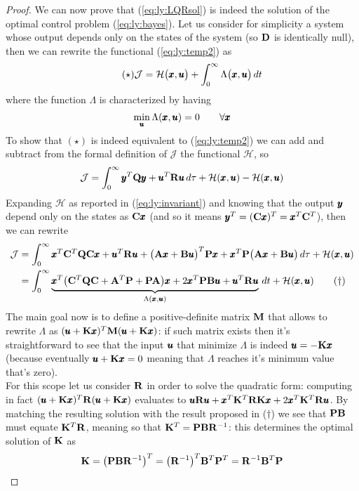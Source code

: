 	\begin{proof}
		We can now prove that (\ref{eq:ly:LQRsol}) is indeed the solution of the optimal control problem (\ref{eq:ly:bayes}). Let us consider for simplicity a system whose output depends only on the states of the system (so $\mathbf{D}$ is identically null), then we can rewrite the functional (\ref{eq:ly:temp2}) as
		\[ \tag{$\star$} \mathcal J = \mathcal H\big(\pmb{x}, \pmb{u} \big) + \int_0^\infty \Lambda\big(\pmb{x}, \pmb{u} \big)\, dt \]
		where the function $\Lambda$ is characterized by having
		\[ \min_{\pmb{u}} \Lambda(\pmb{x},\pmb{u}) = 0 \qquad \forall \pmb{x} \]
		To show that $(\star)$ is indeed equivalent to (\ref{eq:ly:temp2}) we can add and subtract from the formal definition of $\mathcal J$ the functional $\mathcal H$, so
		\[ \mathcal J = \int_0^\infty \pmb{y}^T \mathbf{Q} \pmb{y} + \pmb{u}^T \mathbf{R} \pmb{u} \, d\tau + \mathcal H(\pmb{x},\pmb{u}) - \mathcal H(\pmb{x}, \pmb{u})  \]
		Expanding $\mathcal H$ as reported in (\ref{eq:ly:invariant}) and knowing that the output $\pmb{y}$ depend only on the states as $\mathbf{C} \pmb{x}$ (and so it means $\pmb{y}^T = (\mathbf{C}\pmb{x})^T = \pmb{x}^T \mathbf{C}^T$), then we can rewrite
		\begin{align*}
			\mathcal J & = \int_0^\infty \pmb{x}^T \mathbf{C}^T \mathbf{Q} \mathbf{C} \pmb{x} + \pmb{u}^T \mathbf{R} \pmb{u} + \big(\mathbf{A} \pmb{x} + \mathbf{B} \pmb{u} \big)^T \mathbf{P} \pmb{x} + \pmb{x}^T \mathbf{P} \big(\mathbf{A} \pmb{x} + \mathbf{B} \pmb{u}\big) \, d\tau + \mathcal H(\pmb{x},\pmb{u}) \\
			& = \int_0^\infty \underbrace{\pmb{x}^T \big(\mathbf{C}^T \mathbf{Q} \mathbf{C} + \mathbf{A}^T \mathbf{P} + \mathbf{P} \mathbf{A}\big) \pmb{x} + 2\pmb{x}^T\mathbf{P} \mathbf{B} \pmb{u} + \pmb{u}^T \mathbf{R}\pmb{u}}_{\Lambda(\pmb{x},\pmb{u})}\, dt + \mathcal H(\pmb{x}, \pmb{u}) \tag{$\dagger$}
		\end{align*}
		The main goal now is to define a positive-definite matrix $\mathbf{M}$ that allows to rewrite $\Lambda$ as $(\pmb{u} + \mathbf{K} \pmb{x})^T \mathbf{M}(\pmb{u} + \mathbf{K} \pmb{x})$: if such matrix exists then it's straightforward to see that the input $\pmb{u}$ that minimize $\Lambda$ is indeed $\pmb{u} = - \mathbf{K} \pmb{x}$ (because eventually $\pmb{u} + \mathbf{K} \pmb{x} = 0$ meaning that $\Lambda$ reaches it's minimum value that's zero).\\
		For this scope let us consider $\mathbf{R}$ in order to solve the quadratic form: computing in fact $(\pmb{u} + \mathbf{K} \pmb{x})^T \mathbf{R}(\pmb{u} + \mathbf{K} \pmb{x})$ evaluates to $\pmb{u} \mathbf{R} \pmb{u} + \pmb{x}^T \mathbf{K}^T \mathbf{R} \mathbf{K} \pmb{x} + 2 \pmb{x}^T \mathbf{K}^T\mathbf{R} \pmb{u}$. By matching the resulting solution with the result proposed in ($\dagger$) we see that $\mathbf{P} \mathbf{B}$ must equate $\mathbf{K}^T \mathbf{R}$, meaning so that $\mathbf{K}^T = \mathbf{P} \mathbf{B} \mathbf{R}^{-1}$: this determines the optimal solution of $\mathbf{K}$ as
		\begin{equation}
			\mathbf{K} = \big(\mathbf{P} \mathbf{B} \mathbf{R}^{-1}\big)^T = \big(\mathbf{R}^{-1}\big)^T \mathbf{B}^T \mathbf{P}^T = \mathbf{R}^{-1} \mathbf{B}^T \mathbf{P}
		\end{equation}

\end{proof}
